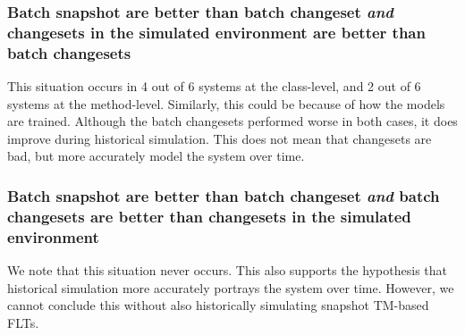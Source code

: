 \subsubsection{Batch snapshot are better than batch changeset
\emph{and} changesets in the simulated environment are better than batch changesets}

%

This situation occurs in
4 out of 6 systems at the class-level, and
2 out of 6 systems at the method-level.
Similarly, this could be because of how the models are trained.
Although the batch changesets performed worse in both cases, it does
improve during historical simulation.
This does not mean that changesets are bad, but more accurately model
the system over time.

\subsubsection{Batch snapshot are better than batch changeset
\emph{and} batch changesets are better than changesets in the simulated environment}

%
%
We note that this situation never occurs.
This also supports the hypothesis that historical simulation more accurately portrays the system over time.
However, we cannot conclude this without also historically simulating snapshot TM-based FLTs.
